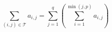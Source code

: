 \begin{displaymath}
 \sum_{(i,j)\in \mathcal T}a_{i,j} =\sum_{j=1}^{q}\left( \sum_{i=1}^{\min(j,p)} a_{i,j}\right)
\end{displaymath}
